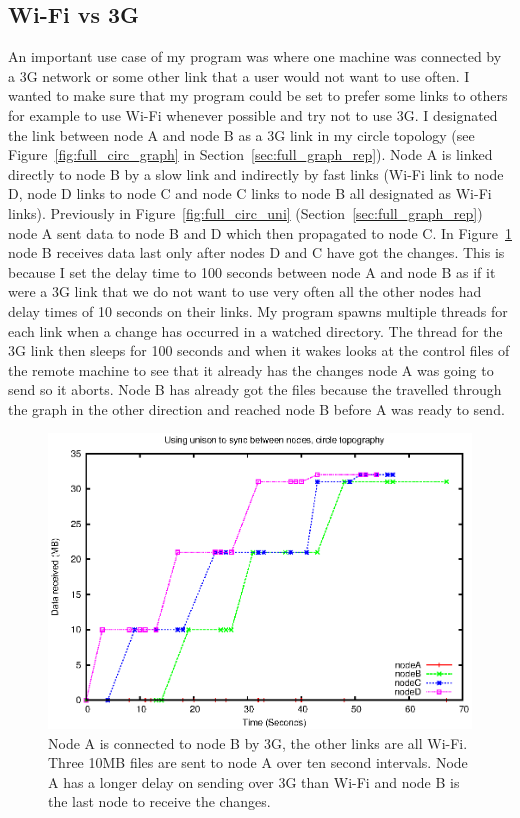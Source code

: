 \documentclass[12pt]{article}
\begin{document}
\subsection{Wi-Fi vs 3G}
An important use case of my program was where one machine was connected
by a 3G network or some other link that a user would not want to use
often.  I wanted to make sure that my program could be set to prefer
some links to others for example to use Wi-Fi whenever possible and try not to
use 3G. I designated the link between node A and node B as a 3G link
in my circle topology (see Figure~\ref{fig:full_circ_graph} in Section~\ref{sec:full_graph_rep}). Node A is linked directly to node B by a slow link and indirectly
by fast links (Wi-Fi link to node D, node D links to node C and node C links
to node B all designated as Wi-Fi links). Previously in Figure~\ref{fig:full_circ_uni} (Section~\ref{sec:full_graph_rep}) node A sent data to
node B and D which then propagated to node C.
In Figure~\ref{fig:circ_uni_thread_100} node B receives data last only after nodes D and C have got the changes.
This is because I set the delay time to 100 seconds between node A and node B
as if it were a 3G link that we do not want to use very often all the other
nodes had delay times of 10 seconds on their links. My program
spawns multiple threads for each link when a change has occurred in a
watched directory. The thread for the 3G link then sleeps for 100 seconds
and when it wakes looks at the control files of the remote machine to
see that it already has the changes node A was going to send so it aborts.
Node B has already got the files because the travelled through the graph
in the other direction and reached node B before A was ready to send.

\begin{figure}[htp]
    \centering
    \includegraphics[height=0.5\textheight]{images/circ-uni-thread-100.eps}
    \caption{Node A is connected to node B by 3G, the other links are all Wi-Fi. Three 10MB files are sent to node A over ten second intervals. Node A has a longer delay on sending over 3G than Wi-Fi and node B is the last node to receive the changes.}
    \label{fig:circ_uni_thread_100}
\end{figure}
\end{document}
